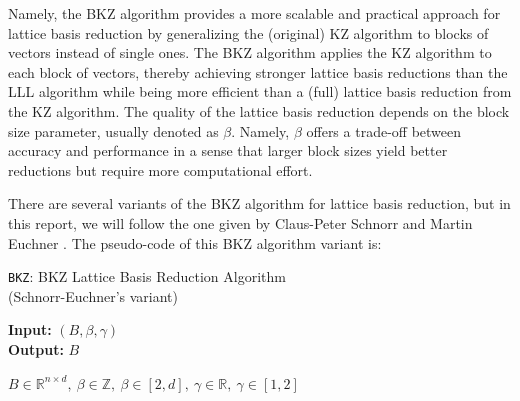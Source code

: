 \documentclass[runningheads]{llncs}
\numberwithin{equation}{section}
\begin{document}
\begin{enumerate}
        Namely, the BKZ algorithm provides a more scalable and practical approach for lattice basis reduction by generalizing the (original) KZ algorithm to blocks of vectors instead of single ones. The BKZ algorithm applies the KZ algorithm to each block of vectors, thereby achieving stronger lattice basis reductions than the LLL algorithm while being more efficient than a (full) lattice basis reduction from the KZ algorithm. The quality of the lattice basis reduction depends on the block size parameter, usually denoted as $\beta$. Namely, $\beta$ offers a trade-off between accuracy and performance in a sense that larger block sizes yield better reductions but require more computational effort.

        \clearpage

        There are several variants of the BKZ algorithm for lattice basis reduction, but in this report, we will follow the one given by Claus-Peter Schnorr and Martin Euchner \cite{schnorr-euchner:lattice-basis-reduction-improved-practical-algorithms-and-solving-subset-sum-problems:1994:06-2024}. The pseudo-code of this BKZ algorithm variant is:

        \vspace{-2ex}
        \begin{algorithm}
            \caption{\texorpdfstring{\texttt{BKZ}}\/: BKZ Lattice Basis Reduction Algorithm\\\phantom{...............................}(Schnorr-Euchner's variant)}
            \label{subrou:bkz-lattice-basis-reduction-algorithm}
            
            \textbf{Input:} $ (B,\beta,\gamma) $\\
            \textbf{Output:} $ B $
            
            \begin{algorithmic}[1]
                \Ensure $B \in {\mathbb{R}}^{n \times d},\ \beta \in \mathbb{Z},\ \beta \in [2,d],\ \gamma \in \mathbb{R},\ \gamma \in [1, 2]$
            
                \vspace{2ex}


\end{algorithmic}
\end{algorithm}
\end{enumerate}
\end{document}
